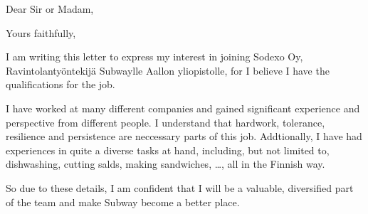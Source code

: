 \documentclass[11pt,a4paper,sans]{moderncv}
\begin{document}
  \clearpage
  \date{February 28, 2020}
  \opening{Dear Sir or Madam,}
  \closing{Yours faithfully,}
  \makelettertitle

  I am writing this letter to express my interest in joining Sodexo Oy,
  Ravintolantyöntekijä Subwaylle Aallon yliopistolle, for
  I believe I have the qualifications for the job.

  I have worked at many different companies and gained significant experience and perspective
  from different people. I understand that hardwork, tolerance, resilience and persistence
  are neccessary parts of this job. Addtionally, I have had experiences in quite
  a diverse tasks at hand, including, but not limited to, dishwashing, cutting
  salds, making sandwiches, \ldots, all in the Finnish way.

  So due to these details, I am confident that I will be a valuable, diversified
  part of the team and make Subway become a better place.

  \makeletterclosing
\end{document}
